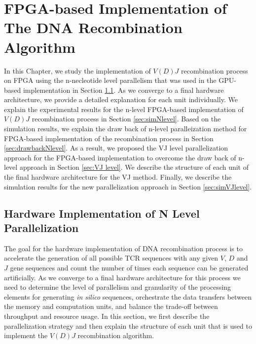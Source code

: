 \chapter{FPGA-based Implementation of The DNA Recombination Algorithm\label{chapter:FPGA}}
In this Chapter, we study the implementation of $V(D)J$ recombination process on FPGA using the n-necleotide level parallelism that was used in the GPU-based implementation in Section \ref{sec:N-level}. As we converge to a final hardware architecture, we provide a detailed explanation for each unit individually. We explain the experimental results for the n-level FPGA-based implementation of $V(D)J$ recombination process in Section \ref{sec:simNlevel}. Based on the simulation results, we explain the draw back of n-level paralleization method for FPGA-based implementation of the recombination process in Section \ref{sec:drawbackNlevel}. As a result, we proposed the VJ level parallelization approach for the FPGA-based implementation to overcome the draw back of n-level approach in Section \ref{sec:VJ level}. We describe the structure of each unit of the final hardware architecture for the VJ method. Finally, we describe the simulation results for the new parallelization approach in Section \ref{sec:simVJlevel}. 



\section{Hardware Implementation of N Level Parallelization }\label{sec:N-level}

The goal for the hardware implementation of DNA recombination process is to accelerate the generation of all possible TCR sequences with any given $V$, $D$ and $J$ gene sequences and count the number of times each sequence can be generated artificially. As we converge to a final hardware architecture for this process we need to determine the level of parallelism and granularity of the processing elements for generating \emph{in silico} sequences, orchestrate the data transfers between the memory  and computation units, and balance the trade-off between throughput and resource usage. In this section, we first  describe the parallelization strategy and then explain the structure of each unit that is used to implement the $V(D)J$ recombination algorithm.

